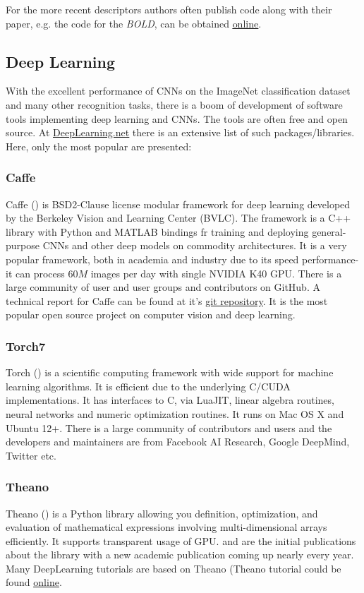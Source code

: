 {For the more recent descriptors authors often publish code along with their paper, e.g. the code for the {\em BOLD}, \cite{Balntas_2015_CVPR} can be obtained \href{http://vbalnt.io/projects/bold/}{\underline{online}}.

\subsection{Deep Learning}\label{soft:DL:subsec}
With the excellent performance of CNNs on the ImageNet classification dataset and many other recognition tasks, there is a boom of development of software tools implementing deep learning and CNNs. 
The tools are often free and open source. At \href{http://deeplearning.net/software_links/}{\underline{DeepLearning.net}} there is an extensive list of such packages/libraries. Here, only the most popular are presented:
\subsubsection{Caffe}
Caffe (\cite{caffe_soft}) is BSD2-Clause license modular framework for deep learning developed by the Berkeley Vision and Learning Center (BVLC). The framework is a C++ library with Python and MATLAB bindings fr training and deploying general-purpose CNNs and other deep models on commodity architectures. It is a very popular framework, both in academia and industry due to its speed performance- it can process $60M$ images per day with single NVIDIA K40 GPU. There is a large community of user and user groups and contributors on GitHub. A technical report for Caffe can be found at it's \href{https://github.com/BVLC/Caffe/}{\underline{git repository}}. It is the most popular open source project on computer vision and deep learning.  
\subsubsection{Torch7}
Torch (\cite{torch_soft}) is a scientific computing framework with wide support for machine learning algorithms. It is efficient due to the underlying C/CUDA implementations. It has interfaces to C, via LuaJIT, linear algebra routines, neural networks and numeric optimization routines. It runs on Mac OS X and Ubuntu 12+. There is a large community of contributors and users and the developers and maintainers are from Facebook AI Research, Google DeepMind, Twitter etc. 
\subsubsection{Theano}
Theano (\cite{theano_soft}) is a Python library allowing you definition, optimization, and evaluation of mathematical expressions involving multi-dimensional arrays efficiently. It supports transparent usage of GPU. \cite{bergstra+al:2010-scipy} and \cite{Bastien-Theano-2012} are the initial publications about the library with a new academic publication coming up nearly every year. Many DeepLearning tutorials are based on Theano (Theano tutorial could be found \href{http://deeplearning.net/software/theano/tutorial/}{\underline{online}}.

}
